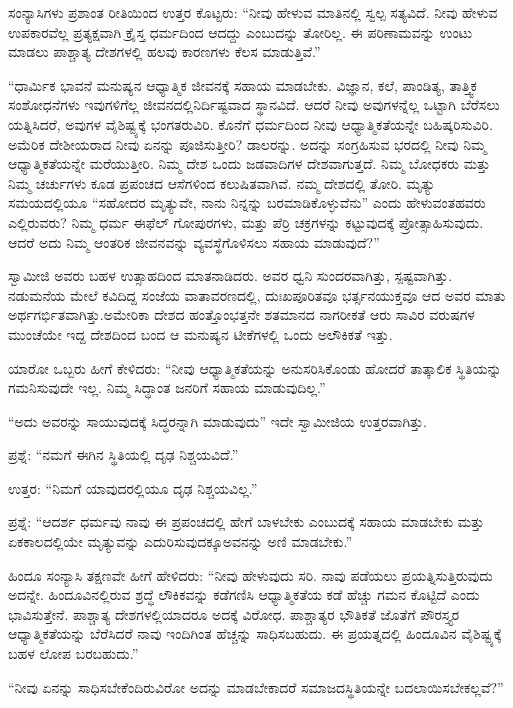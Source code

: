 ಸಂನ್ಯಾಸಿಗಳು ಪ್ರಶಾಂತ ರೀತಿಯಿಂದ ಉತ್ತರ ಕೊಟ್ಟರು: “ನೀವು ಹೇಳುವ ಮಾತಿನಲ್ಲಿ ಸ್ವಲ್ಪ ಸತ್ಯವಿದೆ. ನೀವು ಹೇಳುವ ಉಪಕಾರವೆಲ್ಲ ಪ್ರತ್ಯಕ್ಷವಾಗಿ ಕ್ರೈಸ್ತ ಧರ್ಮದಿಂದ ಆದದ್ದು ಎಂಬುದನ್ನು ತೋರಿಲ್ಲ. ಈ ಪರಿಣಾಮವನ್ನು ಉಂಟು ಮಾಡಲು ಪಾಶ್ಚಾತ್ಯ ದೇಶಗಳಲ್ಲಿ ಹಲವು ಕಾರಣಗಳು ಕೆಲಸ ಮಾಡುತ್ತಿವೆ.”

“ಧಾರ್ಮಿಕ ಭಾವನೆ ಮನುಷ್ಯನ ಆಧ್ಯಾತ್ಮಿಕ ಜೀವನಕ್ಕೆ ಸಹಾಯ ಮಾಡಬೇಕು. ವಿಜ್ಞಾನ, ಕಲೆ, ಪಾಂಡಿತ್ಯ, ತಾತ್ತ್ವಿಕ ಸಂಶೋಧನೆಗಳು ಇವುಗಳಿಗೆಲ್ಲ ಜೀವನದಲ್ಲಿ\break ನಿರ್ದಿಷ್ಟವಾದ ಸ್ಥಾನವಿದೆ. ಆದರೆ ನೀವು ಅವುಗಳನ್ನೆಲ್ಲ ಒಟ್ಟಾಗಿ ಬೆರೆಸಲು ಯತ್ನಿಸಿದರೆ, ಅವುಗಳ ವೈಶಿಷ್ಟ್ಯಕ್ಕೆ ಭಂಗತರುವಿರಿ. ಕೊನೆಗೆ ಧರ್ಮದಿಂದ ನೀವು ಆಧ್ಯಾತ್ಮಿಕತೆಯನ್ನೇ ಬಹಿಷ್ಕರಿಸುವಿರಿ. ಅಮೆರಿಕ ದೇಶೀಯರಾದ ನೀವು ಏನನ್ನು ಪೂಜಿಸುತ್ತೀರಿ? ಡಾಲರನ್ನು. ಅದನ್ನು ಸಂಗ್ರಹಿಸುವ ಭರದಲ್ಲಿ ನೀವು ನಿಮ್ಮ ಆಧ್ಯಾತ್ಮಿಕತೆಯನ್ನೇ ಮರೆಯುತ್ತೀರಿ. ನಿಮ್ಮ ದೇಶ ಒಂದು ಜಡವಾದಿಗಳ ದೇಶವಾಗುತ್ತದೆ. ನಿಮ್ಮ ಬೋಧಕರು ಮತ್ತು ನಿಮ್ಮ ಚರ್ಚುಗಳು ಕೂಡ ಪ್ರಪಂಚದ ಆಸೆಗಳಿಂದ ಕಲುಷಿತವಾಗಿವೆ. ನಮ್ಮ ದೇಶದಲ್ಲಿ ತೋರಿ. ಮೃತ್ಯು ಸಮಯದಲ್ಲಿಯೂ “ಸಹೋದರ ಮೃತ್ಯುವೇ, ನಾನು ನಿನ್ನನ್ನು ಬರಮಾಡಿಕೊಳ್ಳುವೆನು” ಎಂದು ಹೇಳುವಂತಹವರು ಎಲ್ಲಿರುವರು? ನಿಮ್ಮ ಧರ್ಮ ಈಫೆಲ್​ ಗೋಪುರಗಳು, ಮತ್ತು ಪೆರ್ರಿ ಚಕ್ರಗಳನ್ನು ಕಟ್ಟುವುದಕ್ಕೆ ಪ್ರೋತ್ಸಾಹಿಸುವುದು. ಆದರೆ ಅದು ನಿಮ್ಮ ಆಂತರಿಕ ಜೀವನವನ್ನು ವ್ಯವಸ್ಥೆಗೊಳಿಸಲು ಸಹಾಯ ಮಾಡುವುದೆ?”

ಸ್ವಾಮೀಜಿ ಅವರು ಬಹಳ ಉತ್ಸಾಹದಿಂದ ಮಾತನಾಡಿದರು. ಅವರ ಧ್ವನಿ ಸುಂದರವಾಗಿತ್ತು, ಸ್ಪಷ್ಟವಾಗಿತ್ತು. ನಡುಮನೆಯ ಮೇಲೆ ಕವಿದಿದ್ದ ಸಂಜೆಯ ವಾತಾವರಣದಲ್ಲಿ, ದುಃಖಪೂರಿತವೂ ಭರ್ತ್ಸನಯುಕ್ತವೂ ಆದ ಅವರ ಮಾತು ಅರ್ಥಗರ್ಭಿತವಾಗಿತ್ತು.\break ಅಮೇರಿಕಾ ದೇಶದ ಹಂತ್ತೊಂಭತ್ತನೇ ಶತಮಾನದ ನಾಗರೀಕತೆ ಆರು ಸಾವಿರ ವರುಷಗಳ ಮುಂಚೆಯೇ ಇದ್ದ ದೇಶದಿಂದ ಬಂದ ಆ ಮನುಷ್ಯನ ಟೀಕೆಗಳಲ್ಲಿ ಒಂದು ಅಲೌಕಿಕತೆ ಇತ್ತು.

ಯಾರೋ ಒಬ್ಬರು ಹೀಗೆ ಕೇಳಿದರು: “ನೀವು ಆಧ್ಯಾತ್ಮಿಕತೆಯನ್ನು ಅನುಸರಿಸಿಕೊಂಡು ಹೋದರೆ ತಾತ್ಕಾಲಿಕ ಸ್ಥಿತಿಯನ್ನು ಗಮನಿಸುವುದೇ ಇಲ್ಲ. ನಿಮ್ಮ ಸಿದ್ಧಾಂತ ಜನರಿಗೆ ಸಹಾಯ ಮಾಡುವುದಿಲ್ಲ.”

“ಅದು ಅವರನ್ನು ಸಾಯುವುದಕ್ಕೆ ಸಿದ್ಧರನ್ನಾಗಿ ಮಾಡುವುದು” ಇದೇ ಸ್ವಾಮೀಜಿಯ ಉತ್ತರವಾಗಿತ್ತು.

ಪ್ರಶ್ನೆ: “ನಮಗೆ ಈಗಿನ ಸ್ಥಿತಿಯಲ್ಲಿ ದೃಢ ನಿಶ್ಚಯವಿದೆ.”

ಉತ್ತರ: “ನಿಮಗೆ ಯಾವುದರಲ್ಲಿಯೂ ದೃಢ ನಿಶ್ಚಯವಿಲ್ಲ.”

ಪ್ರಶ್ನೆ: “ಆದರ್ಶ ಧರ್ಮವು ನಾವು ಈ ಪ್ರಪಂಚದಲ್ಲಿ ಹೇಗೆ ಬಾಳಬೇಕು ಎಂಬುದಕ್ಕೆ ಸಹಾಯ ಮಾಡಬೇಕು ಮತ್ತು ಏಕಕಾಲದಲ್ಲಿಯೇ ಮೃತ್ಯುವನ್ನು ಎದುರಿಸುವುದಕ್ಕೂ\break ಅವನನ್ನು ಅಣಿ ಮಾಡಬೇಕು.”

ಹಿಂದೂ ಸಂನ್ಯಾಸಿ ತಕ್ಷಣವೇ ಹೀಗೆ ಹೇಳಿದರು: “ನೀವು ಹೇಳುವುದು ಸರಿ. ನಾವು ಪಡೆಯಲು ಪ್ರಯತ್ನಿಸುತ್ತಿರುವುದು ಅದನ್ನೇ. ಹಿಂದೂವಿನಲ್ಲಿರುವ ಶ್ರದ್ಧೆ ಲೌಕಿಕವನ್ನು ಕಡೆಗಣಿಸಿ ಆಧ್ಯಾತ್ಮಿಕತೆಯ ಕಡೆ ಹೆಚ್ಚು ಗಮನ ಕೊಟ್ಟಿದೆ ಎಂದು ಭಾವಿಸುತ್ತೇನೆ. ಪಾಶ್ಚಾತ್ಯ ದೇಶಗಳಲ್ಲಿಯಾದರೂ ಅದಕ್ಕೆ ವಿರೋಧ. ಪಾಶ್ಚಾತ್ಯರ ಭೌತಿಕತೆ ಜೊತೆಗೆ ಪೌರಸ್ತ್ಯರ ಆಧ್ಯಾತ್ಮಿಕತೆಯನ್ನು ಬೆರೆಸಿದರೆ ನಾವು ಇಂದಿಗಿಂತ ಹೆಚ್ಚನ್ನು ಸಾಧಿಸಬಹುದು. ಈ ಪ್ರಯತ್ನದಲ್ಲಿ ಹಿಂದೂವಿನ ವೈಶಿಷ್ಟ್ಯಕ್ಕೆ ಬಹಳ ಲೋಪ ಬರಬಹುದು.”

“ನೀವು ಏನನ್ನು ಸಾಧಿಸಬೇಕೆಂದಿರುವಿರೋ ಅದನ್ನು ಮಾಡಬೇಕಾದರೆ ಸಮಾಜದ\break ಸ್ಥಿತಿಯನ್ನೇ ಬದಲಾಯಿಸಬೇಕಲ್ಲವೆ?”

